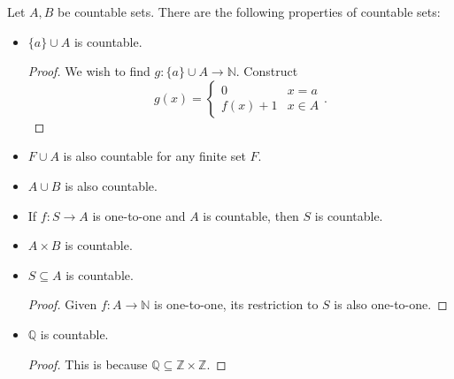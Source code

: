 \begin{property}
	Let \( A,B \) be countable sets. There are the following properties of countable sets:
	\begin{itemize}
		\item \( \{a\} \cup A  \) is countable.
			\begin{proof}
				We wish to find \( g \colon \{a\}  \cup  A \to \mathbb{N}  \). Construct \[
					g(x) = \begin{cases}
						0 & x = a \\
						f(x) + 1 & x \in A
					\end{cases}
				.\] 		
			\end{proof}
		\item \( F \cup A \) is also countable for any finite set \( F \).
		\item \( A \cup  B \) is also countable.
		\item If \( f \colon S \to A \) is one-to-one and \( A \) is countable, then \( S \) is countable.
		\item \( A \times B \) is countable.
		\item \( S \subseteq A \) is countable.
			\begin{proof}
				Given \( f \colon A \to  \mathbb{N} \) is one-to-one, its restriction to \( S \) is also one-to-one.
			\end{proof}
		\item \( \mathbb{Q} \) is countable.
			\begin{proof}
				This is because \( \mathbb{Q} \subseteq \mathbb{Z} \times \mathbb{Z} \). 
			\end{proof}
	\end{itemize}
\end{property}

